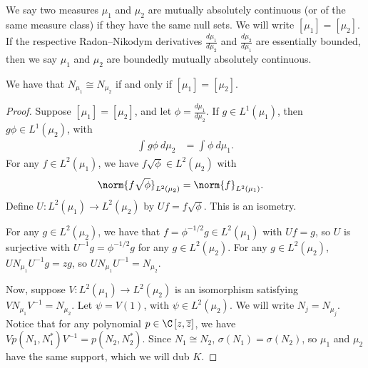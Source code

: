 \documentclass[10pt]{mypackage}
\begin{document}
We say two measures $\mu_1$ and $\mu_2$ are mutually absolutely continuous (or of the same measure class) if they have the same null sets. We will write $\left[ \mu_1 \right] = \left[ \mu_2\right]$. If the respective Radon--Nikodym derivatives $\frac{d\mu_1}{d\mu_2}$ and $ \frac{d\mu_2}{d\mu_1} $ are essentially bounded, then we say $\mu_1$ and $\mu_2$ are boundedly mutually absolutely continuous.
\begin{theorem}
  We have that $N_{\mu_1}\cong N_{\mu_2}$ if and only if $\left[ \mu_1 \right] = \left[ \mu_2 \right]$.
\end{theorem}
\begin{proof}
  Suppose $\left[ \mu_1 \right] = \left[ \mu_2 \right]$, and let $\phi = \frac{d\mu_1}{d\mu_2}$. If $g\in L^1\left( \mu_1 \right)$, then $g\phi\in L^1\left( \mu_2 \right)$, with
  \begin{align*}
    \int_{}^{} g\phi\:d\mu_2 &= \int_{}^{} \phi\:d\mu_1.
  \end{align*}
  For any $f\in L^2\left( \mu_1 \right)$, we have $f\sqrt{\phi}\in L^2\left( \mu_2 \right)$ with 
  \begin{align*}
    \norm{f\sqrt{\phi}}_{L^2\left(\mu_2\right)} &= \norm{f}_{L^2\left( \mu_1 \right)}.
  \end{align*}
  Define $U\colon L^2\left( \mu_1 \right)\to L^2\left( \mu_2 \right)$ by $Uf = f\sqrt{\phi}$. This is an isometry.

  For any $g\in L^2\left( \mu_2 \right)$, we have that $f = \phi^{-1/2}g\in L^2\left( \mu_1 \right)$ with $Uf = g$, so $U$ is surjective with $U^{-1}g = \phi^{-1/2}g$ for any $g\in L^2\left( \mu_2 \right)$. For any $g\in L^2\left( \mu_2 \right)$, $UN_{\mu_1}U^{-1}g = zg$, so $UN_{\mu_1}U^{-1} = N_{\mu_2}$.

  Now, suppose $V\colon L^2\left( \mu_1 \right)\rightarrow L^2\left( \mu_2 \right)$ is an isomorphism satisfying $VN_{\mu_1}V^{-1} = N_{\mu_2}$. Let $\psi = V(1)$, with $\psi\in L^2\left( \mu_2 \right)$. We will write $N_j = N_{\mu_j}$. Notice that for any polynomial $p\in \C\left[ z, \overline{z}\right]$, we have $Vp\left( N_1,N_1^{\ast} \right)V^{-1} = p\left( N_2,N_2^{\ast} \right)$. Since $N_1\cong N_2$, $\sigma\left( N_1 \right) = \sigma\left( N_2 \right)$, so $\mu_1$ and $\mu_2$ have the same support, which we will dub $K$.


\end{proof}
\end{document}
